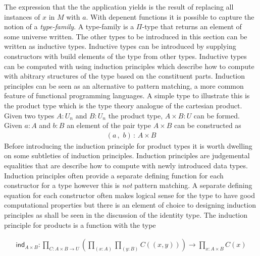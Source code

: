 The expression that the the application yields is the result of replacing all
instances of $x$ in $M$ with $a$. With depenent functions it is possible to
capture the notion of a \textit{type-family}. A type-family is a $\Pi$-type that
returns an element of some universe written. The other types to be introduced in
this section can be written as inductive types. Inductive types can be
introduced by supplying constructors with build elements of the type from other
types.  Inductive types can be computed with using induction principles which
describe how to compute with abitrary structures of the type based on the
constituent parts. Induction principles can be seen as an alternative to pattern
matching, a more common feature of functional programming languages. A simple
type to illustrate this is the product type which is the type theory analogue of
the cartesian product. Given two types $A : U_{n}$ and $B : U_{n}$ the product
type, $A \times B : U$ can be formed. Given $a : A$ and $b : B$ an element of
the pair type $A \times B$ can be constructed as
\begin{align*}
    (a \, , \, \, b) \, : \, A \times B
\end{align*}
Before introducing the induction principle for product types it is worth
dwelling on some subtleties of induction principles. Induction principles are
judgemental equalities that are describe how to compute with newly introduced
data types. Induction principles often provide a separate defining function for
each constructor for a type however this is \textit{not} pattern matching. A
separate defining equation for each constructor often makes logical sense for
the type to have good computational properties but there is an element of choice
to designing induction principles as shall be seen in the discussion of the
identity type. The induction principle for products is a function with the type

\begin{align*}
    \textsf{ind}_{A \times B} : \prod_{C : A \times B\rightarrow
    U}(\prod_{(x : A)}\prod_{(y : B)}C((x , y))) \rightarrow \prod_{x : A\times
    B}C(x)
\end{align*}

